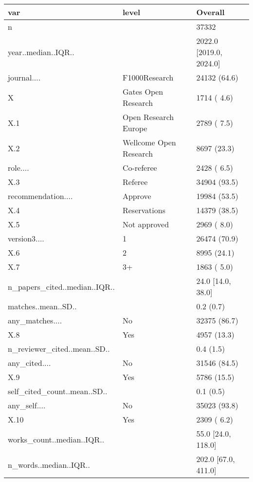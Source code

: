 \begin{table}[ht]
\centering
\begin{tabular}{lll}
 var & level & Overall \\ 
  \hline
n &  &  37332 \\ 
  year..median..IQR.. &  & 2022.0 [2019.0, 2024.0] \\ 
  journal.... & F1000Research &  24132 (64.6)  \\ 
  X & Gates Open Research &   1714 ( 4.6)  \\ 
  X.1 & Open Research Europe &   2789 ( 7.5)  \\ 
  X.2 & Wellcome Open Research &   8697 (23.3)  \\ 
  role.... & Co-referee &   2428 ( 6.5)  \\ 
  X.3 & Referee &  34904 (93.5)  \\ 
  recommendation.... & Approve &  19984 (53.5)  \\ 
  X.4 & Reservations &  14379 (38.5)  \\ 
  X.5 & Not approved &   2969 ( 8.0)  \\ 
  version3.... & 1 &  26474 (70.9)  \\ 
  X.6 & 2 &   8995 (24.1)  \\ 
  X.7 & 3+ &   1863 ( 5.0)  \\ 
  n\_papers\_cited..median..IQR.. &  &   24.0 [14.0, 38.0] \\ 
  matches..mean..SD.. &  &    0.2 (0.7) \\ 
  any\_matches.... & No &  32375 (86.7)  \\ 
  X.8 & Yes &   4957 (13.3)  \\ 
  n\_reviewer\_cited..mean..SD.. &  &    0.4 (1.5) \\ 
  any\_cited.... & No &  31546 (84.5)  \\ 
  X.9 & Yes &   5786 (15.5)  \\ 
  self\_cited\_count..mean..SD.. &  &    0.1 (0.5) \\ 
  any\_self.... & No &  35023 (93.8)  \\ 
  X.10 & Yes &   2309 ( 6.2)  \\ 
  works\_count..median..IQR.. &  &   55.0 [24.0, 118.0] \\ 
  n\_words..median..IQR.. &  &  202.0 [67.0, 411.0] \\ 
  \end{tabular}
\end{table}
